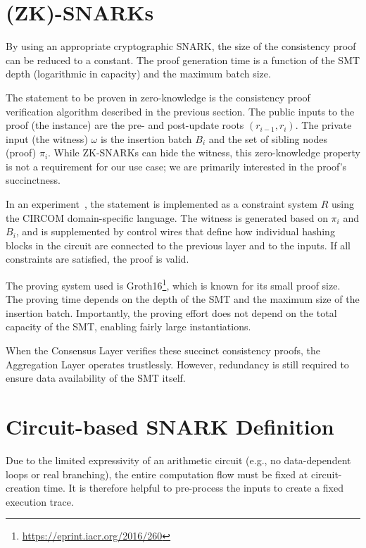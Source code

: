 \documentclass[twocolumn]{article}
\begin{document}
\section{(ZK)-SNARKs}

By using an appropriate cryptographic SNARK, the size of the consistency proof can be reduced to a constant. The proof generation time is a function of the SMT depth (logarithmic in capacity) and the maximum batch size.

The statement to be proven in zero-knowledge is the consistency proof verification algorithm described in the previous section. The public inputs to the proof (the instance) are the pre- and post-update roots $(r_{i-1}, r_i)$. The private input (the witness) $\omega$ is the insertion batch $B_i$ and the set of sibling nodes (proof) $\pi_i$. While ZK-SNARKs can hide the witness, this zero-knowledge property is not a requirement for our use case; we are primarily interested in the proof's succinctness.

In an experiment~\cite{snark}, the statement is implemented as a constraint system $R$ using the CIRCOM domain-specific language. The witness is generated based on $\pi_i$ and $B_i$, and is supplemented by control wires that define how individual hashing blocks in the circuit are connected to the previous layer and to the inputs. If all constraints are satisfied, the proof is valid.

The proving system used is Groth16\footnote{\url{https://eprint.iacr.org/2016/260}}, which is known for its small proof size. The proving time depends on the depth of the SMT and the maximum size of the insertion batch. Importantly, the proving effort does not depend on the total capacity of the SMT, enabling fairly large instantiations.

When the Consensus Layer verifies these succinct consistency proofs, the Aggregation Layer operates trustlessly. However, redundancy is still required to ensure data availability of the SMT itself.


\section{Circuit-based SNARK Definition}

Due to the limited expressivity of an arithmetic circuit (e.g., no data-dependent loops or real branching), the entire computation flow must be fixed at circuit-creation time. It is therefore helpful to pre-process the inputs to create a fixed execution trace.
\end{document}
